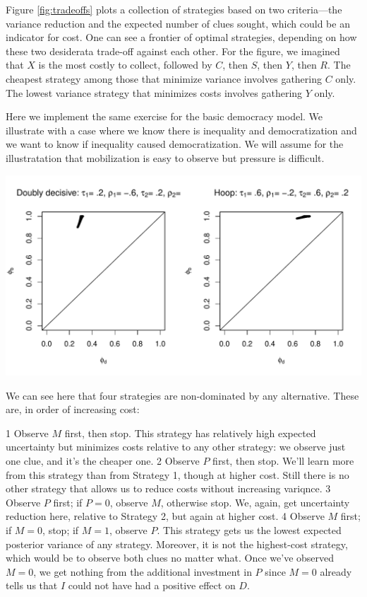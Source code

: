 \documentclass[12pt,]{book}
\begin{document}
Figure \ref{fig:tradeoffs} plots a collection of strategies based on two criteria---the variance reduction and the expected number of clues sought, which could be an indicator for cost. One can see a frontier of optimal strategies, depending on how these two desiderata trade-off against each other. For the figure, we imagined that \(X\) is the most costly to collect, followed by \(C\), then \(S\), then \(Y\), then \(R\). The cheapest strategy among those that minimize variance involves gathering \(C\) only. The lowest variance strategy that minimizes costs involves gathering \(Y\) only.

Here we implement the same exercise for the basic democracy model. We illustrate with a case where we know there is inequality and democratization and we want to know if inequality caused democratization. We will assume for the illustratation that mobilization is easy to observe but pressure is difficult.

\includegraphics{ii_files/figure-latex/unnamed-chunk-78-1.pdf}

We can see here that four strategies are non-dominated by any alternative. These are, in order of increasing cost:

1 Observe \(M\) first, then stop. This strategy has relatively high expected uncertainty but minimizes costs relative to any other strategy: we observe just one clue, and it's the cheaper one.
2 Observe \(P\) first, then stop. We'll learn more from this strategy than from Strategy 1, though at higher cost. Still there is no other strategy that allows us to reduce costs without increasing variqnce.
3 Observe \(P\) first; if \(P=0\), observe \(M\), otherwise stop. We, again, get uncertainty reduction here, relative to Strategy 2, but again at higher cost.
4 Observe \(M\) first; if \(M=0\), stop; if \(M=1\), observe \(P\). This strategy gets us the lowest expected posterior variance of any strategy. Moreover, it is not the highest-cost strategy, which would be to observe both clues no matter what. Once we've observed \(M=0\), we get nothing from the additional investment in \(P\) since \(M=0\) already tells us that \(I\) could not have had a positive effect on \(D\).
\end{document}
